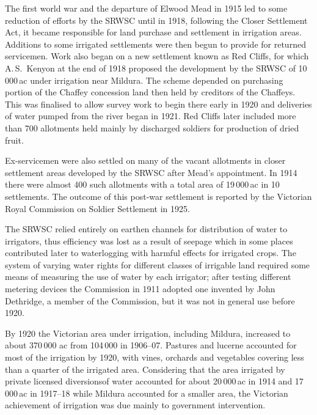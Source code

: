 The first world war and the departure of Elwood Mead in 1915 led to
some reduction of efforts by the SRWSC until in 1918, following the
Closer Settlement Act, it became responsible for land purchase and
settlement in irrigation areas.  Additions to some irrigated
settlements were then begun to provide for returned servicemen.  Work
also began on a new settlement known as Red Cliffs, for which
A.\,S.~Kenyon at the end of 1918 proposed the development by the SRWSC
of 10\,000\,ac under irrigation near Mildura.  The scheme depended on
purchasing portion of the Chaffey concession land then held by
creditors of the Chaffeys.  This was finalised to allow survey work to
begin there early in 1920 and deliveries of water pumped from the
river began in 1921.  Red Cliffs later included more than 700
allotments held mainly by discharged soldiers for production of dried
fruit.

Ex-servicemen were also settled on many of the vacant allotments in
closer settlement areas developed by the SRWSC after Mead's
appointment.  In 1914 there were almost 400 such allotments with a
total area of 19\,000\,ac in 10 settlements. The outcome of this
post-war settlement is reported by the Victorian Royal Commission on
Soldier Settlement in 1925.

The SRWSC relied entirely on earthen channels for distribution of
water to irrigators, thus efficiency was lost as a result of seepage
which in some places contributed later to waterlogging with harmful
effects for irrigated crops.  The system of varying water rights for
different classes of irrigable land required some means of measuring
the use of water by each irrigator; after testing different metering
devices the Commission in 1911 adopted one invented by John Dethridge,
a member of the Commission, but it was not in general use before
1920.

By 1920 the Victorian area under irrigation, including Mildura,
increased to about 370\,000 ac from 104\,000 in 1906--07.  Pastures
and lucerne accounted for most of the irrigation by 1920, with vines,
orchards and vegetables covering less than a quarter of the irrigated
area. Considering that the area irrigated by private licensed
diversionsof water accounted for about 20\,000\,ac in 1914 and
17\,000\,ac in 1917--18 while Mildura accounted for a smaller area,
the Victorian achievement of irrigation was due mainly to government
intervention.

